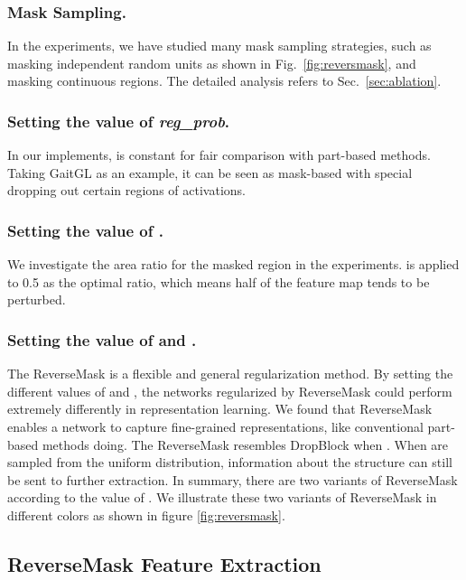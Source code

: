 \documentclass[runningheads]{llncs}
\begin{document}
\subsubsection{Mask Sampling.} In the experiments, we have studied many mask sampling strategies, such as masking independent random units as shown in Fig.~\ref{fig:reversmask}, and masking continuous regions. The detailed analysis refers to Sec.~\ref{sec:ablation}. 

\subsubsection{Setting the value of \textit{reg\_prob}.} In our implements,  is constant for fair comparison with part-based methods. Taking GaitGL as an example, it can be seen as mask-based with special dropping out certain regions of activations.


\subsubsection{Setting the value of .} We investigate the area ratio for the masked region in the experiments.  is applied to 0.5 as the optimal ratio, which means half of the feature map tends to be perturbed.

\subsubsection{Setting the value of  and .} The ReverseMask is a flexible and general regularization method. By setting the different values of  and , the networks regularized by ReverseMask could perform extremely differently in representation learning. We found that ReverseMask enables a network to capture fine-grained representations, like conventional part-based methods doing. The ReverseMask resembles DropBlock when . When  are sampled from the uniform distribution, information about the structure can still be sent to further extraction. In summary, there are two variants of ReverseMask according to the value of . We illustrate these two variants of ReverseMask in different colors as shown in figure \ref{fig:reversmask}.





\subsection{ReverseMask Feature Extraction}
\label{subsection:fe}
\end{document}
